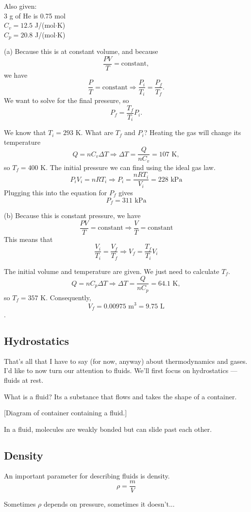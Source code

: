 Also given:\\
3 g of He is 0.75 mol\\
$C_v=12.5$ J/(mol$\cdot$K)\\
$C_p=20.8$ J/(mol$\cdot$K)

(a) Because this is at constant volume, and because
$$\frac{PV}{T}=\mbox{constant},$$
we have
$$\frac{P}{T}=\mbox{constant}\Rightarrow\frac{P_i}{T_i}=\frac{P_f}{T_f}.$$
We want to solve for the final pressure, so
$$P_f=\frac{T_f}{T_i}P_i.$$

We know that $T_i=293\mbox{ K}$. What are $T_f$ and $P_i$? Heating the gas will change its temperature
$$Q=nC_v\Delta{T}\Rightarrow \Delta{T}=\frac{Q}{nC_v}=107\mbox{ K},$$
so $T_f=400$ K. The initial pressure we can find using the ideal gas law.
$$P_iV_i=nRT_i\Rightarrow P_i=\frac{nRT_i}{V_i}=228\mbox{ kPa}$$
Plugging this into the equation for $P_f$ gives
$$\boxed{P_f=311\mbox{ kPa}}$$

(b) Because this is constant pressure, we have
$$\frac{PV}{T}=\mbox{constant}\Rightarrow \frac{V}{T}=\mbox{constant}$$
This means that
$$\frac{V_i}{T_i}=\frac{V_f}{T_f}\Rightarrow V_f=\frac{T_f}{T_i}V_i$$

The initial volume and temperature are given. We just need to calculate $T_f$.
$$Q=nC_p\Delta{T}\Rightarrow \Delta{T}=\frac{Q}{nC_p}=64.1\mbox{ K},$$
so $T_f=357\mbox{ K}$. Consequently, 
$$\boxed{V_f=0.00975\mbox{ m}^3=9.75\mbox{ L}}$$.

\subsection{Hydrostatics}
That's all that I have to say (for now, anyway) about thermodynamics and gases. I'd like to now turn our attention to fluids. We'll first focus on hydrostatics --- fluids at rest.

What is a fluid? Its a substance that flows and takes the shape of a container.

[Diagram of container containing a fluid.]\nopagebreak
\vspace{5cm}

In a fluid, molecules are weakly bonded but can slide past each other.

\subsection{Density}
An important parameter for describing fluids is density.
$$\rho=\frac{m}{V}$$

Sometimes $\rho$ depends on pressure, sometimes it doesn't...

